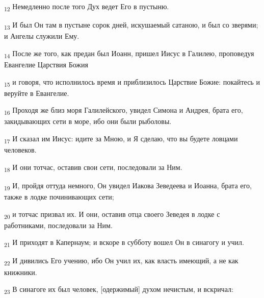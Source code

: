 \begin{tcolorbox}
\textsubscript{12} Немедленно после того Дух ведет Его в пустыню.
\end{tcolorbox}
\begin{tcolorbox}
\textsubscript{13} И был Он там в пустыне сорок дней, искушаемый сатаною, и был со зверями; и Ангелы служили Ему.
\end{tcolorbox}
\begin{tcolorbox}
\textsubscript{14} После же того, как предан был Иоанн, пришел Иисус в Галилею, проповедуя Евангелие Царствия Божия
\end{tcolorbox}
\begin{tcolorbox}
\textsubscript{15} и говоря, что исполнилось время и приблизилось Царствие Божие: покайтесь и веруйте в Евангелие.
\end{tcolorbox}
\begin{tcolorbox}
\textsubscript{16} Проходя же близ моря Галилейского, увидел Симона и Андрея, брата его, закидывающих сети в море, ибо они были рыболовы.
\end{tcolorbox}
\begin{tcolorbox}
\textsubscript{17} И сказал им Иисус: идите за Мною, и Я сделаю, что вы будете ловцами человеков.
\end{tcolorbox}
\begin{tcolorbox}
\textsubscript{18} И они тотчас, оставив свои сети, последовали за Ним.
\end{tcolorbox}
\begin{tcolorbox}
\textsubscript{19} И, пройдя оттуда немного, Он увидел Иакова Зеведеева и Иоанна, брата его, также в лодке починивающих сети;
\end{tcolorbox}
\begin{tcolorbox}
\textsubscript{20} и тотчас призвал их. И они, оставив отца своего Зеведея в лодке с работниками, последовали за Ним.
\end{tcolorbox}
\begin{tcolorbox}
\textsubscript{21} И приходят в Капернаум; и вскоре в субботу вошел Он в синагогу и учил.
\end{tcolorbox}
\begin{tcolorbox}
\textsubscript{22} И дивились Его учению, ибо Он учил их, как власть имеющий, а не как книжники.
\end{tcolorbox}
\begin{tcolorbox}
\textsubscript{23} В синагоге их был человек, [одержимый] духом нечистым, и вскричал:
\end{tcolorbox}
